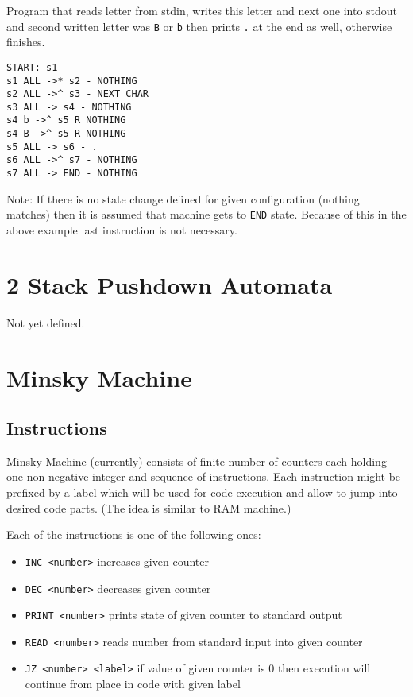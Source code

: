 \documentclass[english,shortabstract,mgr]{iithesis}
\begin{document}
Program that reads letter from stdin, writes this letter and next one into
stdout and second written letter was \texttt{B} or \texttt{b} then prints
\texttt{.} at the end as well, otherwise finishes.

\begin{verbatim}
START: s1
s1 ALL ->* s2 - NOTHING
s2 ALL ->^ s3 - NEXT_CHAR
s3 ALL -> s4 - NOTHING
s4 b ->^ s5 R NOTHING
s4 B ->^ s5 R NOTHING
s5 ALL -> s6 - .
s6 ALL ->^ s7 - NOTHING
s7 ALL -> END - NOTHING
\end{verbatim}

Note: If there is no state change defined for given configuration
(nothing matches) then it is assumed that machine gets to \texttt{END} state.
Because of this in the above example last instruction is not necessary.

\section {2 Stack Pushdown Automata}
Not yet defined.

\section {Minsky Machine}

\subsection {Instructions}
Minsky Machine (currently) consists of finite number of counters
each holding one non-negative integer and sequence of instructions.
Each instruction might be prefixed by a label which will be used for
code execution and allow to jump into desired code parts. (The idea is similar
to RAM machine.)

Each of the instructions is one of the following ones:
\begin{itemize}
  \item \texttt{INC <number>} increases given counter
  \item \texttt{DEC <number>} decreases given counter
  \item \texttt{PRINT <number>} prints state of given counter to standard output
  \item \texttt{READ <number>} reads number from standard input into given counter
  \item \texttt{JZ <number> <label>} if value of given counter is 0 then execution
        will continue from place in code with given label
\end{itemize}
\end{document}
